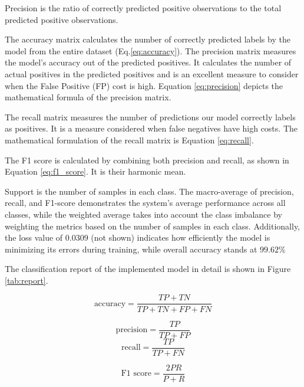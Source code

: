 Precision is the ratio of correctly predicted positive observations to the total predicted positive observations. 

The accuracy matrix calculates the number of correctly predicted labels by the model from the entire dataset (Eq.\ref{eq:accuracy}). 
The precision matrix measures the model's accuracy out of the predicted positives. It calculates the number of actual positives in the predicted positives and is an excellent measure to consider when the False Positive (FP) cost is high. Equation \ref{eq:precision} depicts the mathematical formula of the precision matrix.

The recall matrix measures the number of predictions our model correctly labels as positives. It is a measure considered when false negatives have high costs. The mathematical formulation of the recall matrix is Equation \ref{eq:recall}. 

The F1 score is calculated by combining both precision and recall, as shown in Equation \ref{eq:f1_score}. It is their harmonic mean.

Support is the number of samples in each class. 
The macro-average of precision, recall, and F1-score demonstrates the system's average performance across all classes, while the weighted average takes into account the class imbalance by weighting the metrics based on the number of samples in each class.\newline
Additionally, the loss value of 0.0309 (not shown) indicates how efficiently the model is minimizing its errors during training, while overall accuracy stands at $99.62\%$

The classification report of the implemented model in detail is shown in Figure \ref{tab:report}. 


\begin{equation}
	\text{accuracy} = \frac{TP + TN}{TP + TN + FP +FN}
	\label{eq:accuracy}
\end{equation}

\begin{equation}
	\text{precision} = \frac{TP}{TP + FP}
	\label{eq:precision}
\end{equation}
\begin{equation}
	\text{recall} = \frac{TP}{TP + FN}
	\label{eq:recall}
\end{equation}

\begin{equation}
	\text{F1 score} = \frac{2 P  R}{P+ R} 
	\label{eq:f1_score}
\end{equation}




